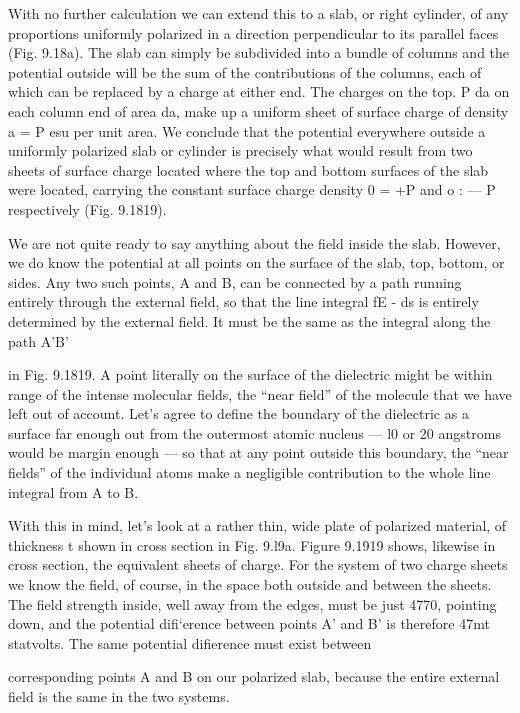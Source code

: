 With no further calculation we can extend this to a slab, or right
cylinder, of any proportions uniformly polarized in a direction perpendicular
to its parallel faces (Fig. 9.18a). The slab can simply be
subdivided into a bundle of columns and the potential outside will
be the sum of the contributions of the columns, each of which can
be replaced by a charge at either end. The charges on the top. P da
on each column end of area da, make up a uniform sheet of surface
charge of density a = P esu per unit area. We conclude that the
potential everywhere outside a uniformly polarized slab or cylinder
is precisely what would result from two sheets of surface charge
located where the top and bottom surfaces of the slab were located,
carrying the constant surface charge density 0 = +P and o :  --- P
respectively (Fig. 9.1819).

We are not quite ready to say anything about the field inside the
slab. However, we do know the potential at all points on the surface
of the slab, top, bottom, or sides. Any two such points, A and B,
can be connected by a path running entirely through the external
field, so that the line integral fE - ds is entirely determined by the
external field. It must be the same as the integral along the path A'B'

in Fig. 9.1819. A point literally on the surface of the dielectric might
be within range of the intense molecular fields, the ``near field'' of
the molecule that we have left out of account. Let's agree to define
the boundary of the dielectric as a surface far enough out from the
outermost atomic nucleus --- l0 or 20 angstroms would be margin
enough --- so that at any point outside this boundary, the ``near fields''
of the individual atoms make a negligible contribution to the whole
line integral from A to B.

With this in mind, let's look at a rather thin, wide plate of polarized
material, of thickness t shown in cross section in Fig. 9.l9a. Figure
9.1919 shows, likewise in cross section, the equivalent sheets of charge.
For the system of two charge sheets we know the field, of course, in
the space both outside and between the sheets. The field strength
inside, well away from the edges, must be just 4770, pointing down,
and the potential difi‘erence between points A' and B' is therefore
47mt statvolts. The same potential difierence must exist between

corresponding points A and B on our polarized slab, because the
entire external field is the same in the two systems.

